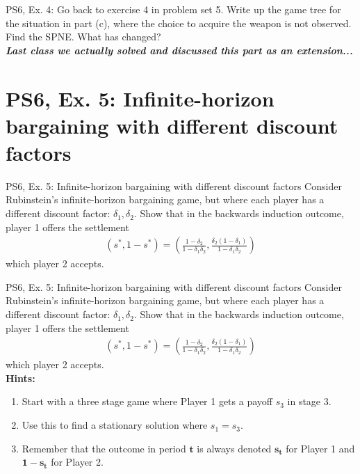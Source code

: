 \begin{frame}{PS6, Ex. 4: }
    Go back to exercise 4 in problem set 5. Write up the game tree for the situation in part (c), where the choice to acquire the weapon is not observed. Find the SPNE. What has changed?\\\bigskip
    \textbf{\textit{Last class we actually solved and discussed this part as an extension...}}
\end{frame}



\section{PS6, Ex. 5: Infinite-horizon bargaining with different discount factors}

\begin{frame}{PS6, Ex. 5: Infinite-horizon bargaining with different discount factors}
    Consider Rubinstein's infinite-horizon bargaining game, but where each player has a different discount factor: $\delta_1,\delta_2$. Show that in the backwards induction outcome, player 1 offers the settlement
    \begin{align}
        (s^{*},1-s^{*})=\left( \frac{1-\delta_2}{1-\delta_1\delta_2},\frac{\delta_2(1-\delta_1)}{1-\delta_1\delta_2}\right)
    \end{align}
    which player 2 accepts.
    \vfill\null
\end{frame}
\begin{frame}{PS6, Ex. 5: Infinite-horizon bargaining with different discount factors}
    Consider Rubinstein's infinite-horizon bargaining game, but where each player has a different discount factor: $\delta_1,\delta_2$. Show that in the backwards induction outcome, player 1 offers the settlement
    \begin{align}
        (s^{*},1-s^{*})=\left( \frac{1-\delta_2}{1-\delta_1\delta_2},\frac{\delta_2(1-\delta_1)}{1-\delta_1\delta_2}\right)
    \end{align}
    which player 2 accepts.\\\medskip
    \textbf{Hints:}
    \begin{enumerate}
      \item Start with a three stage game where Player 1 gets a payoff $s_3$ in stage 3.
      \item Use this to find a stationary solution where $s_1=s_3$.
      \item Remember that the outcome in period $\bm{t}$ is always denoted $\bm{s_t}$ for Player 1 and $\bm{1-s_t}$ for Player 2.
    \end{enumerate}
    \vfill\null
\end{frame}

